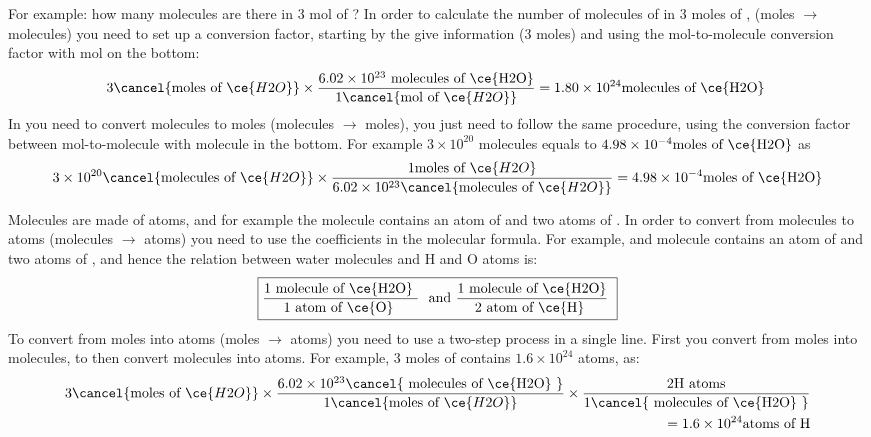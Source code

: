 \documentclass[main.tex]{subfiles}
\begin{document}
\begin{description}
For example: how many molecules are there in 3 mol of ? In order to calculate the number of molecules of  in 3 moles of , (moles $\rightarrow$ molecules) you need to set up a conversion factor, starting by the give information (3 moles) and using the mol-to-molecule conversion factor with mol on the bottom:
\begin{equation*}
3   \cancel{\text{moles of }\ce{H2O}} \times 
\dfrac{6.02\times 10^{23} \text{ molecules of \ce{H2O}}   } {  1\cancel{\text{mol of }\ce{H2O}}} =1.80\times 10^{24}\text{molecules of \ce{H2O} }
\end{equation*}
In you need to convert molecules to moles (molecules $\rightarrow$ moles), you just need to follow the same procedure, using the conversion factor between mol-to-molecule with molecule in the bottom. For example $3\times 10^{20}$  molecules equals to $4.98\times 10^{-4}\text{moles of \ce{H2O}}$ as
\begin{equation*}
3\times 10^{20}   \cancel{\text{molecules of }\ce{H2O}} \times 
\dfrac{ 1 \text{moles of }\ce{H2O}   } {  6.02\times 10^{23} \cancel{\text{molecules of }\ce{H2O}}} =4.98\times 10^{-4}\text{moles of \ce{H2O}}
\end{equation*}
\item[\docfilehook{From molecules to atoms}{From  molecules to atoms}] Molecules are made of atoms, and for example the  molecule contains an atom of  and two atoms of . In order to convert from molecules to atoms (molecules $\rightarrow$ atoms) you need to use the coefficients in the molecular formula. For example, and  molecule contains an atom of  and two atoms of , and hence the relation between water molecules and H and O atoms is:
\begin{equation*}
\boxed{   \frac{1\text{ molecule of  \ce{H2O} }}{1 \text{ atom of \ce{O} } }\ \text{ and  } \frac{1 \text{ molecule of \ce{H2O}}}{2 \text{ atom of \ce{H} } }\     }
\end{equation*}
To convert from moles into atoms (moles $\rightarrow$ atoms) you need to use a two-step process in a single line. First you convert from moles  into molecules, to then convert molecules into atoms. For example, 3 moles of  contains $1.6\times 10^{24}$  atoms, as:
 \begin{equation*}\begin{split}
3   \cancel{\text{moles of }\ce{H2O}} \times 
\dfrac{6.02\times 10^{23} \cancel{\text{ molecules of \ce{H2O} }}  } {  1\cancel{\text{moles of }\ce{H2O}}} 
\times\dfrac{2 \text{H atoms}}{1\cancel{\text{ molecules of \ce{H2O} }}}
\\=1.6\times 10^{24}\text{atoms of H}
\end{split}\end{equation*}




\end{description}
\end{document}
